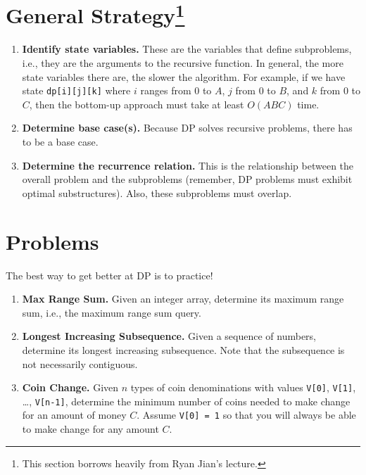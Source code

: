 \documentclass[11pt]{article}
\begin{document}
\section{General Strategy\protect\footnote{This section borrows heavily from Ryan Jian's lecture.}}
\begin{enumerate}
    \item \textbf{Identify state variables.} These are the variables that define subproblems, i.e., they are the arguments to the recursive function. In general, the more state variables there are, the slower the algorithm. For example, if we have state \texttt{dp[i][j][k]} where $i$ ranges from 0 to $A$, $j$ from 0 to $B$, and $k$ from 0 to $C$, then the bottom-up approach must take at least $O(ABC)$ time.
    \item \textbf{Determine base case(s).} Because DP solves recursive problems, there has to be a base case.
    \item \textbf{Determine the recurrence relation.} This is the relationship between the overall problem and the subproblems (remember, DP problems must exhibit optimal substructures). Also, these subproblems must overlap.
\end{enumerate}


\section{Problems}
The best way to get better at DP is to practice!
\begin{enumerate}
    \item \textbf{Max Range Sum.} Given an integer array, determine its maximum range sum, i.e., the maximum range sum query.
    \item \textbf{Longest Increasing Subsequence.} Given a sequence of numbers, determine its longest increasing subsequence. Note that the subsequence is not necessarily contiguous.
    \item \textbf{Coin Change.} Given $n$ types of coin denominations with values \texttt{V[0]}, \texttt{V[1]}, \dots, \texttt{V[n-1]}, determine the minimum number of coins needed to make change for an amount of money $C$. Assume \texttt{V[0] = 1} so that you will always be able to make change for any amount $C$.
\end{enumerate}
\end{document}
